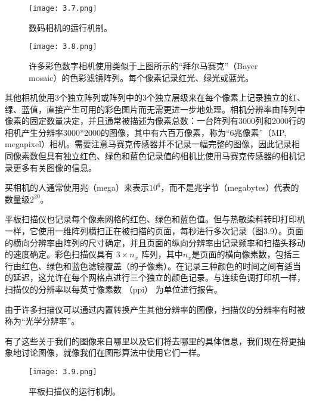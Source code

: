 \documentclass[lang=cn,12pt]{elegantbook}
\begin{document}
\begin{figure}[htb]
  \centering
  \begin{minipage}[t]{0.45\textwidth}
    \centering
    \texttt{[image: 3.7.png]}
    \caption{数码相机的运行机制。}
  \end{minipage}
  \begin{minipage}[t]{0.45\textwidth}
    \centering
    \texttt{[image: 3.8.png]}
    \caption{许多彩色数字相机使用类似于上图所示的“拜尔马赛克”（Bayer mosaic）的色彩滤镜阵列。每个像素记录红光、绿光或蓝光。}
  \end{minipage}
\end{figure}

其他相机使用3个独立阵列或阵列中的3个独立层级来在每个像素上记录独立的红、绿、蓝值，直接产生可用的彩色图片而无需更进一步地处理。相机分辨率由阵列中像素的固定数量决定，并且通常被描述为像素总数：一台阵列有3000列和2000行的相机产生分辨率3000*2000的图像，其中有六百万像素，称为“6兆像素”（MP, megapixel）相机。需要注意马赛克传感器并不记录一幅完整的图像，因此记录相同像素数但具有独立红色、绿色和蓝色记录值的相机比使用马赛克传感器的相机记录更多有关图像的信息。

\begin{note}
  买相机的人通常使用兆（mega）来表示$10^6$，而不是兆字节（megabytes）代表的数量级$2^{20}$。
\end{note}

平板扫描仪也记录每个像素网格的红色、绿色和蓝色值。但与热敏染料转印打印机一样，它使用一维阵列横扫正在被扫描的页面，每秒进行多次记录（图3.9）。页面的横向分辨率由阵列的尺寸确定，并且页面的纵向分辨率由记录频率和扫描头移动的速度确定。彩色扫描仪具有 $3\times n_x$ 阵列，其中$n_x$是页面的横向像素数，包括三行由红色、绿色和蓝色滤镜覆盖（的子像素）。在记录三种颜色的时间之间有适当的延迟，这允许在每个网格点进行三个独立的颜色记录。与连续色调打印机一样，扫描仪的分辨率以每英寸像素数 （ppi） 为单位进行报告。

\begin{note}
  由于许多扫描仪可以通过内置转换产生其他分辨率的图像，扫描仪的分辨率有时被称为“光学分辨率”。
\end{note}

有了这些关于我们的图像来自哪里以及它们将去哪里的具体信息，我们现在将更抽象地讨论图像，就像我们在图形算法中使用它们一样。

\begin{figure}[htb]
  \centering
  \texttt{[image: 3.9.png]}
  \caption{平板扫描仪的运行机制。}
\end{figure}
\end{document}
